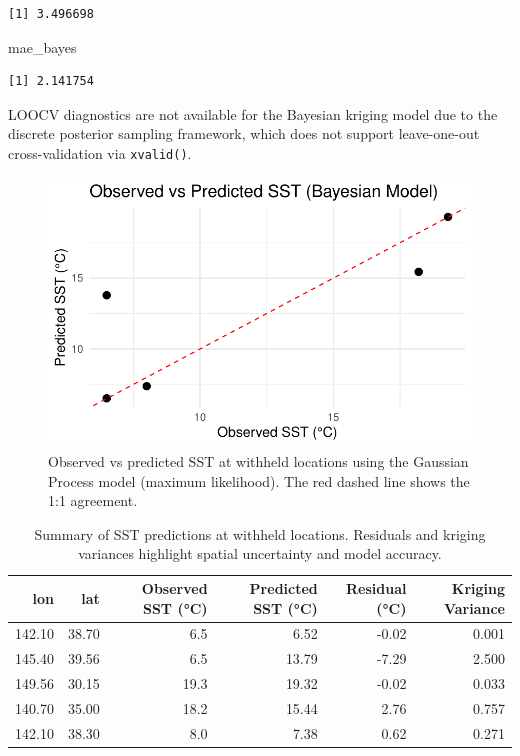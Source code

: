 \documentclass[
  11pt,
]{article}
\newenvironment{Shaded}{\begin{snugshade}}{\end{snugshade}}
\newcommand{\NormalTok}[1]{\textcolor[rgb]{0.00,0.23,0.31}{#1}}
\begin{document}
\begin{verbatim}
[1] 3.496698
\end{verbatim}

\begin{Shaded}
\begin{Highlighting}[]
\NormalTok{mae\_bayes}
\end{Highlighting}
\end{Shaded}

\begin{verbatim}
[1] 2.141754
\end{verbatim}

LOOCV diagnostics are not available for the Bayesian kriging model due
to the discrete posterior sampling framework, which does not support
leave-one-out cross-validation via \texttt{xvalid()}.

\begin{figure}[H]

{\centering \includegraphics{project_files/figure-pdf/fig-bayes_pred_scatter-1.pdf}

}

\caption{Observed vs predicted SST at withheld locations using the
Gaussian Process model (maximum likelihood). The red dashed line shows
the 1:1 agreement.}

\end{figure}%

\begin{table}

\caption{Summary of SST predictions at withheld locations. Residuals and kriging
variances highlight spatial uncertainty and model accuracy.}
\centering
\begin{tabular}[t]{rrrrrr}
\toprule
lon & lat & Observed SST (°C) & Predicted SST (°C) & Residual (°C) & Kriging Variance\\
\midrule
142.10 & 38.70 & 6.5 & 6.52 & -0.02 & 0.001\\
145.40 & 39.56 & 6.5 & 13.79 & -7.29 & 2.500\\
149.56 & 30.15 & 19.3 & 19.32 & -0.02 & 0.033\\
140.70 & 35.00 & 18.2 & 15.44 & 2.76 & 0.757\\
142.10 & 38.30 & 8.0 & 7.38 & 0.62 & 0.271\\
\bottomrule
\end{tabular}
\end{table}
\end{document}
